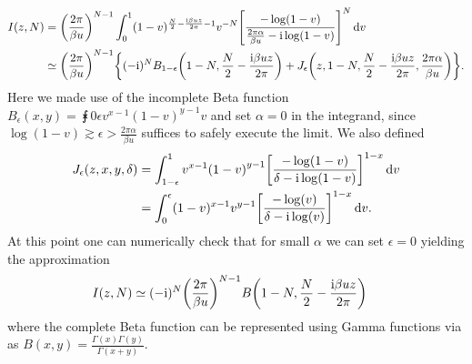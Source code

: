 \documentclass[english, parskip=full]{scrartcl}
\begin{document}
\begin{align}
I(z,N) &= \kla*{\frac{2\pi}{\beta u}}^{N-1} \intx{0}{1}{ (1-v)^{\frac{N}{2} - \frac{\i \beta u z}{2\pi}-1} v^{-N} \klb*{\frac{-\log(1-v)}{ \frac{2\pi\alpha}{\beta u} - \i \log(1-v) }}^N }{v}\\
&\simeq \kla*{\frac{2\pi}{\beta u}}^{N-1} \klc*{(-\i)^N B_{1-\epsilon}\kla*{1-N, \frac{N}{2} - \frac{\i\beta uz}{2\pi}} + J_\epsilon\kla*{z, 1-N, \frac{N}{2} - \frac{\i\beta uz}{2\pi}, \frac{2\pi\alpha}{\beta u}}}.
\end{align}
Here we made use of the incomplete Beta function $B_\epsilon(x,y) = \intx{0}{\epsilon}{v^{x-1} (1-v)^{y-1}}{v}$ and set $\alpha=0$ in the integrand, since $\log(1-v) \gtrsim \epsilon > \frac{2\pi\alpha}{\beta u}$ suffices to safely execute the limit.
We also defined
\begin{align}
J_\epsilon(z,x,y,\delta) &= \intx{1-\epsilon}{1}{v^{x-1} \kla*{1 - v}^{y-1} \klb*{\frac{-\log(1-v)}{\delta - \i \log(1-v)}}^{1-x}}{v}\\
&= \intx{0}{\epsilon}{(1-v)^{x-1} v^{y-1} \klb*{\frac{-\log(v)}{\delta - \i\log(v)}}^{1-x}}{v}.
\end{align}
At this point one can numerically check that for small $\alpha$ we can set $\epsilon=0$ yielding the approximation
\begin{align}
I(z,N) &\simeq (-\i)^N \kla*{\frac{2\pi}{\beta u}}^{N-1} B\kla*{1 - N, \frac{N}{2} - \frac{\i\beta uz}{2\pi}}
\end{align}
where the complete Beta function can be represented using Gamma functions via as $B(x,y) = \frac{\Gamma(x)\Gamma(y)}{\Gamma(x+y)}$.
\end{document}
